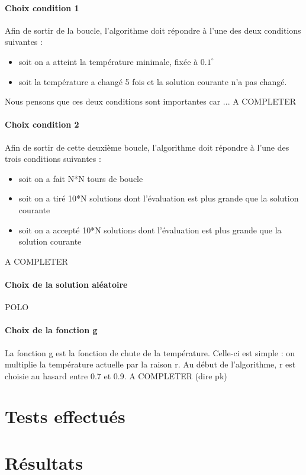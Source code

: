 \documentclass[12pt]{article}
\begin{document}
\paragraph{Choix condition 1} Afin de sortir de la boucle, l’algorithme doit répondre à l’une des deux conditions suivantes :
	\begin{itemize}
    \item soit on a atteint la température minimale, fixée à $0.1^\circ$
    \item soit la température a changé 5 fois et la solution courante n’a pas changé.
    \end{itemize}

Nous pensons que ces deux conditions sont importantes car ... A COMPLETER

\paragraph{Choix condition 2} Afin de sortir de cette deuxième boucle, l’algorithme doit répondre à l’une des trois conditions suivantes :
	\begin{itemize}
	\item soit on a fait N*N tours de boucle
	\item soit on a tiré 10*N solutions dont l’évaluation est plus grande que la solution courante
	\item soit on a accepté 10*N solutions dont l’évaluation est plus grande que la solution courante
	\end{itemize}


A COMPLETER

\paragraph{Choix de la solution aléatoire} POLO
\paragraph{Choix de la fonction g} La fonction g est la fonction de chute de la température. Celle-ci est simple : on multiplie la température actuelle par la raison r. Au début de l’algorithme, r est choisie au hasard entre 0.7 et 0.9. A COMPLETER (dire pk)

\section{Tests effectués}
\section{Résultats}
\end{document}
